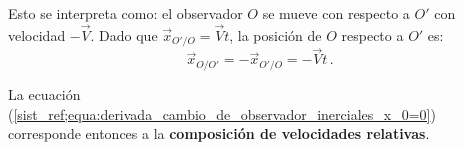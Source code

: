 \documentclass[../apunte_mecanica_clasica.tex]{subfiles}%
\begin{document}
Esto se interpreta como: el observador $O$ se mueve con respecto a $O'$ con velocidad $-\vec{V}$. Dado que $\vec{x}_{O'/O} = \vec{V}t$, la posición de $O$ respecto a $O'$ es:
\begin{equation*}
    \vec{x}_{O/O'} = -\vec{x}_{O'/O} = -\vec{V}t \,.
\end{equation*}

La ecuación (\ref{sist_ref;equa:derivada_cambio_de_observador_inerciales_x_0=0}) corresponde entonces a la \textbf{composición de velocidades relativas}.

\clearpage
\end{document}
